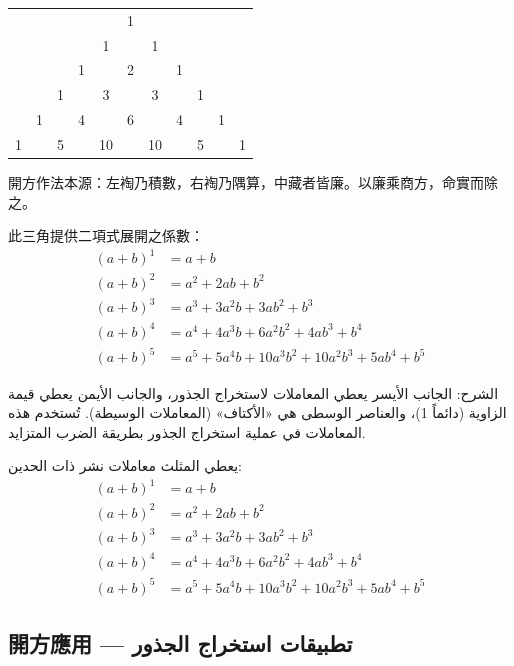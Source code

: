 \documentclass[11pt,a4paper]{article}
\newcommand{\ar}[1]{\arabicfont\beginR #1\endR}
\newcommand{\ChinCol}[1]{\begin{minipage}[t]{0.48\textwidth}#1\end{minipage}}
\newcommand{\ArabCol}[1]{\begin{minipage}[t]{0.48\textwidth}\arabicfont\beginR #1\endR\end{minipage}}
\newcommand{\parallelsection}[2]{%
  \noindent\ChinCol{#1}\hfill\ArabCol{#2}\par\vspace{0.5cm}%
}
\begin{document}
\begin{center}
\begin{tabular}{ccccccccccc}
 & & & & & 1 & & & & & \\
 & & & & 1 & & 1 & & & & \\
 & & & 1 & & 2 & & 1 & & & \\
 & & 1 & & 3 & & 3 & & 1 & & \\
 & 1 & & 4 & & 6 & & 4 & & 1 & \\
 1 & & 5 & & 10 & & 10 & & 5 & & 1 \\
\end{tabular}
\end{center}

\vspace{0.5cm}

\parallelsection{%
開方作法本源：左裪乃積數，右裪乃隅算，中藏者皆廉。以廉乘商方，命實而除之。

\medskip
此三角提供二項式展開之係數：
\begin{align*}
(a+b)^1 &= a + b \\
(a+b)^2 &= a^2 + 2ab + b^2 \\
(a+b)^3 &= a^3 + 3a^2b + 3ab^2 + b^3 \\
(a+b)^4 &= a^4 + 4a^3b + 6a^2b^2 + 4ab^3 + b^4 \\
(a+b)^5 &= a^5 + 5a^4b + 10a^3b^2 + 10a^2b^3 + 5ab^4 + b^5
\end{align*}%
}{%
الشرح: الجانب الأيسر يعطي المعاملات لاستخراج الجذور، والجانب الأيمن يعطي قيمة الزاوية (دائماً 1)، والعناصر الوسطى هي «الأكتاف» (المعاملات الوسيطة). تُستخدم هذه المعاملات في عملية استخراج الجذور بطريقة الضرب المتزايد.

\medskip
يعطي المثلث معاملات نشر ذات الحدين:
\begin{align*}
(a+b)^1 &= a + b \\
(a+b)^2 &= a^2 + 2ab + b^2 \\
(a+b)^3 &= a^3 + 3a^2b + 3ab^2 + b^3 \\
(a+b)^4 &= a^4 + 4a^3b + 6a^2b^2 + 4ab^3 + b^4 \\
(a+b)^5 &= a^5 + 5a^4b + 10a^3b^2 + 10a^2b^3 + 5ab^4 + b^5
\end{align*}%
}

\subsection{開方應用 --- \ar{تطبيقات استخراج الجذور}}
\end{document}

